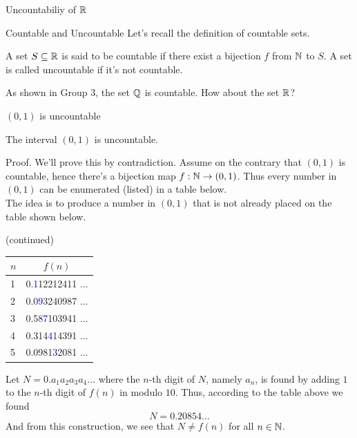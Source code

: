\documentclass{beamer}
\begin{document}
\begin{frame}[plain]
  \begin{center}
    {\huge\color{blue} Uncountabiliy of $\R$}
  \end{center}
\end{frame}
\begin{frame}{Countable and Uncountable}
  Let's recall the definition of countable sets.
  \pause
  \begin{definition}
    A set $S\subseteq\R$ is said to be countable if there
    exist a bijection $f$ from $\N$ to $S$.
    A set is called uncountable if it's not countable.
  \end{definition}
  \pause
  As shown in Group 3, the set $\Q$ is countable. 
  How about the set $\R$? 
\end{frame}
\begin{frame}{$(0,1)$ is uncountable}
  \pause
  \begin{lemma}
    The interval $(0,1)$ is uncountable.
  \end{lemma}
  \pause
  \begin{block}{Proof.}
    We'll prove this by contradiction.
    \pause
    Assume on the contrary that $(0,1)$ is countable, hence
    there's a bijection map $f:\N\to (0,1)$. 
    \pause
    Thus every number in $(0,1)$ can be enumerated (listed) 
    in a table below. \\[0.3cm]
    \pause
    The idea is to produce a number in $(0,1)$ that is not already
    placed on the table shown below.
  \end{block}
\end{frame}
\begin{frame}[plain]
  \begin{block}{(continued)}
    \begin{center}
      \begin{tabular}{l|l}
        $n$ & \multicolumn{1}{c}{$f(n)$}\\\hline
        1   & 0.\textcolor{blue}{1}12212411 $\dots$ \\
        2   & 0.0\textcolor{blue}{9}3240987 $\dots$ \\
        3   & 0.58\textcolor{blue}{7}103941 $\dots$ \\
        4   & 0.314\textcolor{blue}{4}14391 $\dots$ \\
        5   & 0.0981\textcolor{blue}{3}2081 $\dots$ 
      \end{tabular}
    \end{center}
    \pause
    Let $N=0.a_1a_2a_3a_4\dots$ where the $n$-th digit of $N$, namely $a_n$,
    is found by adding $1$ to the $n$-th digit of $f(n)$ in modulo $10$.
    \pause
    Thus, according to the table above we found
    \[ N=0.20854\dots \]
    \pause
    And from this construction, we see that $N\neq f(n)$ for all $n\in\N$.
  \end{block}
\end{frame}
\end{document}
